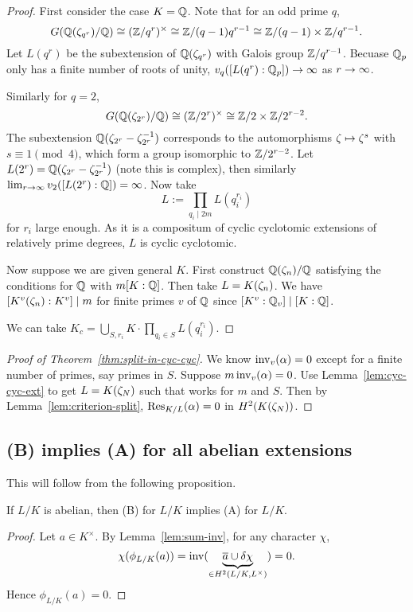 \begin{proof}
First consider the case $K=\mathbb{Q}$. Note that for an odd prime $q$,
\[
G(\mathbb{Q}(\zeta_{q^r})/\mathbb{Q})\cong (\mathbb{Z}/q^r)^{\times}\cong \mathbb{Z}/(q-1)q^{r-1}\cong \mathbb{Z}/(q-1)\times \mathbb{Z}/q^{r-1}.
\]
Let $L(q^r)$ be the subextension of $\mathbb{Q}(\zeta_{q^r})$ with Galois group $\mathbb{Z}/q^{r-1}$. Becuase $\mathbb{Q}_p$ only has a finite number of roots of unity, $v_q([L(q^r):\mathbb{Q}_p])\to \infty$ as $r\to \infty$.

Similarly for $q=2$,
\[
G(\mathbb{Q}(\zeta_{2^r})/\mathbb{Q})\cong (\mathbb{Z}/2^r)^{\times}\cong \mathbb{Z}/2\times \mathbb{Z}/2^{r-2}.
\]
The subextension $\mathbb{Q}(\zeta_{2^r}-\zeta_{2^r}^{-1})$ corresponds to the automorphisms $\zeta\mapsto \zeta^s$ with $s\equiv 1\pmod 4$, which form a group isomorphic to $\mathbb{Z}/2^{r-2}$. Let $L(2^r)=\mathbb{Q}(\zeta_{2^r}-\zeta_{2^r}^{-1})$ (note this is complex), then similarly $\lim_{r\to \infty}v_2([L(2^r):\mathbb{Q}])=\infty$. Now take
\[
L:=\prod_{q_i\mid 2m} L(q_i^{r_i})
\]
for $r_i$ large enough. 
As it is a compositum of cyclic cyclotomic extensions of relatively prime degrees, $L$ is cyclic cyclotomic.

Now suppose we are given general $K$. First construct $\mathbb{Q}(\zeta_n)/\mathbb{Q}$ satisfying the conditions for $\mathbb{Q}$ with $m[K:\mathbb{Q}]$. Then take $L=K(\zeta_n)$. We have $[K^v(\zeta_n):K^v]\mid m$ for finite primes $v$ of $\mathbb{Q}$ since $[K^v:\mathbb{Q}_v]\mid [K:\mathbb{Q}]$.

We can take $K_c=\bigcup_{S,r_i} K\cdot \prod_{q_i\in S} L(q_i^{r_i})$.
\end{proof}
\begin{proof}[Proof of Theorem~\ref{thm:split-in-cyc-cyc}]
We know $\operatorname{inv}_v(\alpha)=0$ except for a finite number of primes, say primes in $S$. 
Suppose $m\operatorname{inv}_v(\alpha)=0$. Use Lemma~\ref{lem:cyc-cyc-ext} to get $L=K(\zeta_N)$ such that works for $m$ and $S$. Then by Lemma~\ref{lem:criterion-split}, $\operatorname{Res}_{K/L}(\alpha)=0$ in $H^2(K(\zeta_N))$.
\end{proof}

\subsection{(B) implies (A) for all abelian extensions}
This will follow from the following proposition.
\begin{pr}
If $L/K$ is abelian, then (B) for $L/K$ implies (A) for $L/K$.
\end{pr}
\begin{proof}
Let $a\in K^{\times}$. By Lemma~\ref{lem:sum-inv}, for any character $\chi$,
\[
\chi(\phi_{L/K}(a))=\operatorname{inv}(\underbrace{\overline{a}\cup \delta \chi}_{\in H^2(L/K,L^{\times})})=0.
\]
Hence $\phi_{L/K}(a)=0$.
\end{proof}

